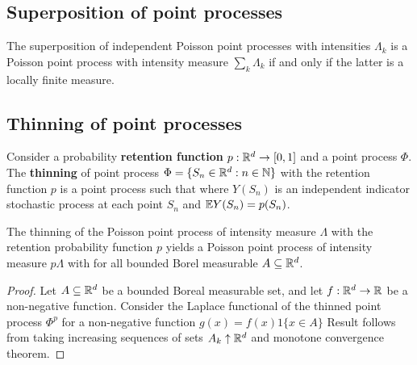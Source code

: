\documentclass[a4paper,english,10pt]{article}
\begin{document}
\subsection{Superposition of point processes}
\begin{thm}
The superposition of independent Poisson point processes with intensities $\Lambda_k$ 
is a Poisson point process with intensity measure $\sum_k \Lambda_k$ if and only if the latter is a locally finite measure.
\end{thm}
\subsection{Thinning of point processes}
Consider a probability \textbf{retention function} $p: \mathbb{R}^d \to [0,1]$ and a point process $\Phi$. 
The \textbf{thinning} of point process $\Phi = \{S_n \in \mathbb{R}^d: n \in \mathbb{N}\}$ with the retention function $p$ is a point process such that 
where $Y(S_n)$ is an independent indicator stochastic process at each point $S_n$ and $\mathbb{E} Y(S_n) = p(S_n)$. 
\begin{thm}
The thinning of the Poisson point process of intensity measure $\Lambda$ with the retention probability function $p$ 
yields a Poisson point process of intensity measure $p\Lambda$ with 
for all bounded Borel measurable $A \subseteq \mathbb{R}^d$.
\end{thm}
\begin{proof}
Let $A \subseteq \mathbb{R}^d$ be a bounded Boreal measurable set, and let $f: \mathbb{R}^d \to \mathbb{R}$ be a non-negative function. 
Consider the Laplace functional of the thinned point process $\Phi^p$ for a non-negative function $g(x) = f(x)1\{x \in A\}$
Result follows from taking increasing sequences of sets $A_k \uparrow \mathbb{R}^d$ and monotone convergence theorem.
\end{proof}
\end{document}
